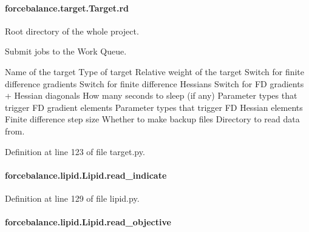 \hypertarget{classforcebalance_1_1target_1_1Target_a4edb69fbde792e9f2f27e54b7c978c8e}{
\paragraph[{rd}]{\setlength{\rightskip}{0pt plus 5cm}forcebalance.\-target.\-Target.\-rd\hspace{0.3cm}{\ttfamily [inherited]}}}\label{classforcebalance_1_1target_1_1Target_a4edb69fbde792e9f2f27e54b7c978c8e}


Root directory of the whole project. 

Submit jobs to the Work Queue.

Name of the target Type of target Relative weight of the target Switch for finite difference gradients Switch for finite difference Hessians Switch for F\-D gradients + Hessian diagonals How many seconds to sleep (if any) Parameter types that trigger F\-D gradient elements Parameter types that trigger F\-D Hessian elements Finite difference step size Whether to make backup files Directory to read data from.

Definition at line 123 of file target.\-py.

\hypertarget{classforcebalance_1_1lipid_1_1Lipid_af5dfb680e8dc79f92c8e882f72f15559}{
\paragraph[{read\-\_\-indicate}]{\setlength{\rightskip}{0pt plus 5cm}forcebalance.\-lipid.\-Lipid.\-read\-\_\-indicate}}\label{classforcebalance_1_1lipid_1_1Lipid_af5dfb680e8dc79f92c8e882f72f15559}


Definition at line 129 of file lipid.\-py.

\hypertarget{classforcebalance_1_1lipid_1_1Lipid_a0edba63f8f5fbc3f8c51df153a886db9}{
\paragraph[{read\-\_\-objective}]{\setlength{\rightskip}{0pt plus 5cm}forcebalance.\-lipid.\-Lipid.\-read\-\_\-objective}}\label{classforcebalance_1_1lipid_1_1Lipid_a0edba63f8f5fbc3f8c51df153a886db9}


